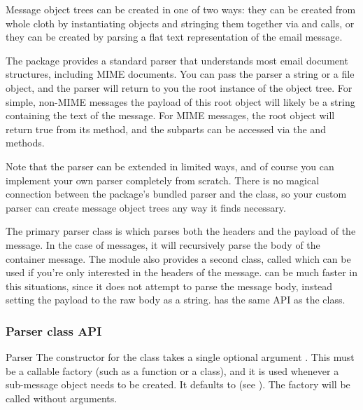 
Message object trees can be created in one of two ways: they can be
created from whole cloth by instantiating  objects and
stringing them together via  and
 calls, or they can be created by parsing a flat text
representation of the email message.

The  package provides a standard parser that understands
most email document structures, including MIME documents.  You can
pass the parser a string or a file object, and the parser will return
to you the root  instance of the object tree.  For
simple, non-MIME messages the payload of this root object will likely
be a string containing the text of the message.  For MIME
messages, the root object will return true from its
 method, and the subparts can be accessed via
the  and  methods.

Note that the parser can be extended in limited ways, and of course
you can implement your own parser completely from scratch.  There is
no magical connection between the  package's bundled
parser and the  class, so your custom parser can create
message object trees any way it finds necessary.

The primary parser class is  which parses both the
headers and the payload of the message.  In the case of
 messages, it will recursively parse the body of
the container message.  The  module also provides
a second class, called  which can be used if
you're only interested in the headers of the message.
 can be much faster in this situations, since it
does not attempt to parse the message body, instead setting the
payload to the raw body as a string.   has the
same API as the  class.

\subsubsection{Parser class API}

\begin{classdesc}{Parser}{}
The constructor for the  class takes a single optional
argument .  This must be a callable factory (such as a
function or a class), and it is used whenever a sub-message object
needs to be created.  It defaults to  (see
).  The factory will be called without
arguments.
\end{classdesc}

